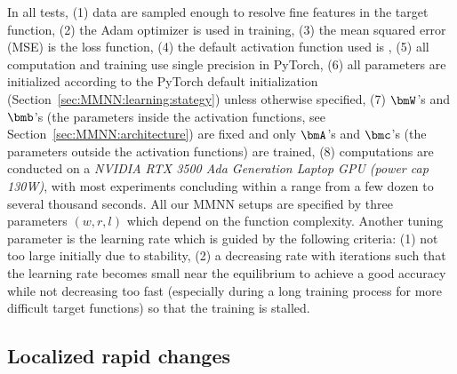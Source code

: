 \documentclass[review,hidelinks,onefignum,onetabnum]{siamart250211}
\begin{document}
In all tests, (1) data are sampled enough to resolve fine features in the target function, (2) the Adam optimizer is used in training, (3) the mean squared error (MSE) is the loss function, (4) the default activation function used is \ReLU, (5)
all computation and training use single precision in PyTorch,
(6) 
all parameters are initialized according to the PyTorch default initialization (Section~\ref{sec:MMNN:learning:stategy}) unless otherwise specified,
(7) $\bmW$'s and $\bmb$'s (the parameters inside the activation functions, see Section~\ref{sec:MMNN:architecture}) are fixed and only $\bmA$'s and $\bmc$'s (the parameters outside the activation functions) are trained,
(8)
computations are conducted on a \textit{NVIDIA RTX 3500 Ada Generation Laptop GPU (power cap 130W)}, with most experiments concluding within a range from a few dozen to several thousand seconds.
All our MMNN setups are specified by three parameters $(w,r,l)$ which depend on the function complexity. Another tuning parameter is the learning rate which is guided by the following criteria: (1) not too large initially due to stability, (2) a decreasing rate with iterations such that the learning rate becomes small near the equilibrium to achieve a good accuracy while not decreasing too fast (especially during a long training process for more difficult target functions) so that the training is stalled. 

\subsection{Localized rapid changes}\label{sec:local}
\end{document}
